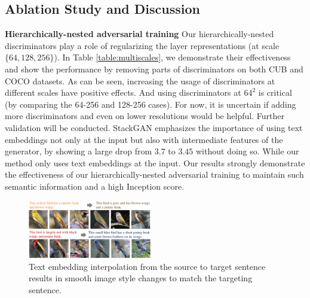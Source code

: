\documentclass[10pt,twocolumn,letterpaper]{article}
\begin{document}
\subsection{Ablation Study and Discussion}
\textbf{Hierarchically-nested adversarial training} Our hierarchically-nested discriminators play a role of regularizing the layer representations (at scale $\{64, 128, 256\}$). 
In Table \ref{table:multiscales}, we demonstrate their effectiveness and show the performance by removing parts of discriminators on both CUB and COCO datasets. 
As can be seen, increasing the usage of discriminators at different scales have positive effects. And using discriminators at $64^2$ is critical (by comparing the 64-256 and 128-256 cases). For now, it is uncertain if adding more discriminators and even on lower resolutions would be helpful. Further validation will be conducted.
StackGAN emphasizes the importance of using text embeddings not only at the input but also with intermediate features of the generator, by showing a large drop from $3.7$ to $3.45$ without doing so. While our method only uses text embeddings at the input. Our results strongly demonstrate the effectiveness of our hierarchically-nested adversarial training to maintain such semantic information and a high Inception score. 

\begin{figure}[t]
    \centering
    \includegraphics[width=0.48\textwidth]{figure/interp.pdf}
    \vspace{-.6cm}
    \caption{Text embedding interpolation from the source to target sentence results in smooth image style changes to match the targeting sentence. } \label{fig:interp}
    \vspace{-.3cm}
\end{figure}
\end{document}
